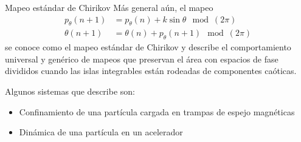 \documentclass[aspectratio=169,xcolor=dvipsnames,7pt]{beamer}
\begin{document}
\begin{frame}{Mapeo estándar de Chirikov}
Más general aún, el mapeo 
\begin{align*}
p_\theta(n+1) &= p_\theta(n) + k\sin\theta\mod{(2\pi)} \\
\theta(n+1) &= \theta(n) + p_\theta(n+1)\mod{(2\pi)}
\end{align*}
se conoce como el mapeo estándar de Chirikov y describe el comportamiento 
universal y genérico de mapeos que preservan el área con espacios de 
fase divididos cuando las islas integrables están rodeadas de componentes
caóticas. \vskip 10pt 

Algunos sistemas que describe son:
\begin{itemize}
\item Confinamiento de una partícula cargada en trampas de espejo magnéticas 
\item Dinámica de una partícula en un acelerador
\end{itemize}
\end{frame}
\end{document}
